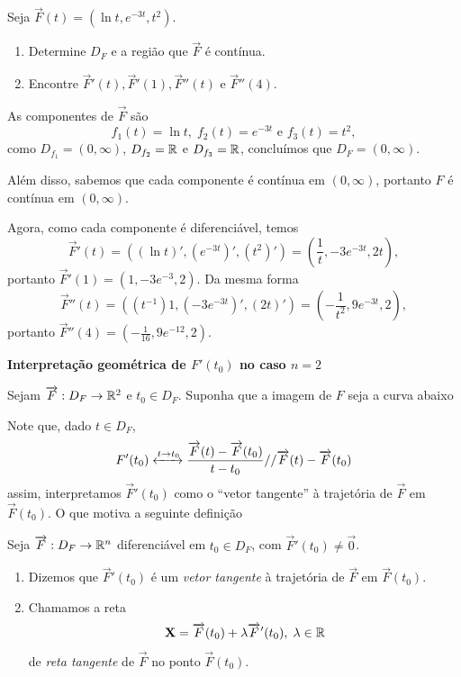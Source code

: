 \begin{example}
    Seja \(\overrightarrow{F}(t) = (\ln t, e^{-3t}, t^2)\).
        \begin{enumerate}
            \item Determine \(D_F\) e a região que \(\overrightarrow{F}\) é contínua.
            \item Encontre \(\overrightarrow{F}'(t), \overrightarrow{F}'(1), \overrightarrow{F}''(t)\) e \(\overrightarrow{F}''(4)\).
        \end{enumerate}

    As componentes de \(\overrightarrow{F}\) são \[f_1(t) = \ln t, \; f_2(t) = e^{-3t} \text{ e } f_3(t) = t^2,\] como \(D_{f_1} = (0,\infty)\), \(D_{f_2} = \mathbb{R}\) e \(D_{f_3} = \mathbb{R}\), concluímos que \(D_F = (0,\infty)\).

    Além disso, sabemos que cada componente é contínua em \((0,\infty)\), portanto \(F\) é contínua em \((0,\infty)\).

    Agora, como cada componente é diferenciável, temos \[\overrightarrow{F}'(t) = \left( (\ln t)', (e^{-3t})', (t^2)' \right) = \left( \frac{1}{t}, -3e^{-3t}, 2t \right),\] portanto \(\overrightarrow{F}'(1) = (1,-3e^{-3},2)\). Da mesma forma \[\overrightarrow{F}''(t) = \left( (t^{-1})1, (-3e^{-3t})', (2t)' \right) = \left( -\frac{1}{t^2}, 9 e^{-3t}, 2 \right),\] portanto \(\overrightarrow{F}''(4) = \left( -\frac{1}{16}, 9e^{-12}, 2 \right)\).
\end{example}

\textbf{Interpretação geométrica de \(F'(t_0)\) no caso \(n=2\)}

Sejam \(\overrightarrow{F}: D_F \to \mathbb{R}^2\) e \(t_0\in D_F\). Suponha que a imagem de \(F\) seja a curva abaixo

Note que, dado \(t\in D_F\), \[F'(t_0) \xleftrightarrow{t\to t_0} \frac{\overrightarrow{F}(t) - \overrightarrow{F}(t_0)}{t-t_0} // \overrightarrow{F}(t) - \overrightarrow{F}(t_0)\] assim, interpretamos \(\overrightarrow{F}'(t_0)\) como o ``vetor tangente'' à trajetória de \(\overrightarrow{F}\) em \(\overrightarrow{F}(t_0)\). O que motiva a seguinte definição

\begin{definition}
    Seja \(\overrightarrow{F}: D_F \to \mathbb{R}^n\) diferenciável em \(t_0\in D_F\), com \(\overrightarrow{F}'(t_0)\neq\overrightarrow{0}\).
        \begin{enumerate}
            \item Dizemos que \(\overrightarrow{F}'(t_0)\) é um \textit{vetor tangente}\label{Vetor tangente} à trajetória de \(\overrightarrow{F}\) em \(\overrightarrow{F}(t_0)\).
            \item Chamamos a reta \[\mathbf{X} = \overrightarrow{F}(t_0) + \lambda\overrightarrow{F}'(t_0),\; \lambda\in\mathbb{R}\] de \textit{reta tangente}\label{Reta tangente} de \(\overrightarrow{F}\) no ponto \(\overrightarrow{F}(t_0)\).
        \end{enumerate}
\end{definition}

